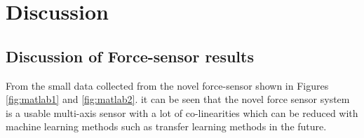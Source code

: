 \section{Discussion}
\subsection{Discussion of Force-sensor results}
From the small data collected from the novel force-sensor shown in Figures \ref{fig:matlab1} and \ref{fig:matlab2}. it can be seen that the novel force sensor system is a usable multi-axis sensor with a lot of co-linearities which can be reduced with machine learning methods such as transfer learning methods in the future.